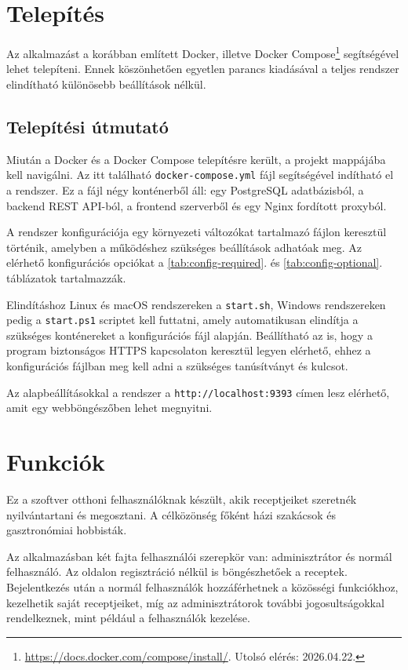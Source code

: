 \section{Telepítés}
Az alkalmazást a korábban említett Docker, illetve Docker Compose\footnote{\url{https://docs.docker.com/compose/install/}. Utolsó elérés: 2026.04.22.} segítségével lehet telepíteni. Ennek köszönhetően egyetlen parancs kiadásával a teljes rendszer elindítható különösebb beállítások nélkül.

\subsection{Telepítési útmutató}
Miután a Docker és a Docker Compose telepítésre került, a projekt mappájába kell navigálni. Az itt található \texttt{docker-compose.yml} fájl segítségével indítható el a rendszer. Ez a fájl négy konténerből áll: egy PostgreSQL adatbázisból, a backend REST API-ból, a frontend szerverből és egy Nginx fordított proxyból.

A rendszer konfigurációja egy környezeti változókat tartalmazó fájlon keresztül történik, amelyben a működéshez szükséges beállítások adhatóak meg. Az elérhető konfigurációs opciókat a \ref{tab:config-required}. és \ref{tab:config-optional}. táblázatok tartalmazzák.

Elindításhoz Linux és macOS rendszereken a \texttt{start.sh}, Windows rendszereken pedig a \texttt{start.ps1} scriptet kell futtatni, amely automatikusan elindítja a szükséges konténereket a konfigurációs fájl alapján. Beállítható az is, hogy a program biztonságos HTTPS kapcsolaton keresztül legyen elérhető, ehhez a konfigurációs fájlban meg kell adni a szükséges tanúsítványt és kulcsot.

Az alapbeállításokkal a rendszer a \texttt{http://localhost:9393} címen lesz elérhető, amit egy webböngészőben lehet megnyitni.

\section{Funkciók}
Ez a szoftver otthoni felhasználóknak készült, akik receptjeiket szeretnék nyilvántartani és megosztani. A célközönség főként házi szakácsok és gasztronómiai hobbisták.

Az alkalmazásban két fajta felhasználói szerepkör van: adminisztrátor és normál felhasználó. Az oldalon regisztráció nélkül is böngészhetőek a receptek. Bejelentkezés után a normál felhasználók hozzáférhetnek a közösségi funkciókhoz, kezelhetik saját receptjeiket, míg az adminisztrátorok további jogosultságokkal rendelkeznek, mint például a felhasználók kezelése.
